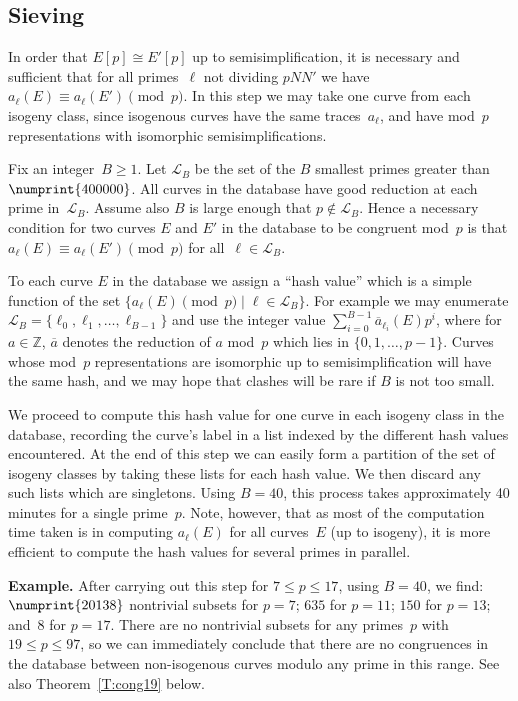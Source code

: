 \documentclass[12pt]{amsart}
\newcommand{\Z}{\mathbb{Z}}
\newcommand{\calL}{\mathcal{L}}
\numberwithin{equation}{section}
\theoremstyle{definition}
\theoremstyle{remark}
\begin{document}
\subsection{Sieving}
In order that $E[p]\cong E'[p]$ up to semisimplification, it is
necessary and sufficient that for all primes~$\ell$ not dividing
$pNN'$ we have $a_{\ell}(E)\equiv a_{\ell}(E')\pmod{p}$.  In this step
we may take one curve from each isogeny class, since isogenous curves
have the same traces~$a_\ell$, and have mod~$p$ representations with
isomorphic semisimplifications.

Fix an integer~$B\ge1$.  Let $\calL_B$ be the set of the $B$ smallest
primes greater than $\numprint{400000}$. All curves in the database
have good reduction at each prime in~$\calL_B$.  Assume also $B$ is
large enough that $p\notin\calL_B$.  Hence a necessary condition for
two curves $E$ and $E'$ in the database to be congruent mod~$p$ is
that $a_{\ell}(E)\equiv a_{\ell}(E')\pmod{p}$ for all~$\ell\in\calL_B$.

To each curve $E$ in the database we assign a ``hash value'' which is
a simple function of the set $\{a_{\ell}(E)\pmod{p}\mid
\ell\in\calL_B\}$.  For example we may enumerate
$\calL_B=\{\ell_0,\ell_1,\dots,\ell_{B-1}\}$ and use the integer value
$\sum_{i=0}^{B-1}\overline{a}_{\ell_i}(E)p^i$, where for $a\in\Z$,
$\overline{a}$ denotes the reduction of $a$ mod~$p$ which lies in
$\{0,1,\dots,p-1\}$.  Curves whose mod~$p$ representations are
isomorphic up to semisimplification will have the same hash, and we
may hope that clashes will be rare if $B$ is not too small.

We proceed to compute this hash value for one curve in each isogeny
class in the database, recording the curve's label in a list indexed
by the different hash values encountered.  At the end of this step we
can easily form a partition of the set of isogeny classes by taking
these lists for each hash value.  We then discard any such lists which
are singletons.  Using $B=40$, this process takes approximately 40
minutes for a single prime~$p$.  Note, however, that as most of the
computation time taken is in computing $a_{\ell}(E)$ for all
curves~$E$ (up to isogeny), it is more efficient to compute the hash
values for several primes in parallel.

{\bf Example.} After carrying out this step for $7\le p\le17$, using
$B=40$, we find: $\numprint{20138}$ nontrivial subsets for $p=7$;
$635$ for $p=11$; $150$ for $p=13$; and~$8$ for $p=17$.  There are no
nontrivial subsets for any primes~$p$ with $19\le p\le97$, so we can
immediately conclude that there are no congruences in the database
between non-isogenous curves modulo any prime in this range.  See also
Theorem~\ref{T:cong19} below.
\end{document}
